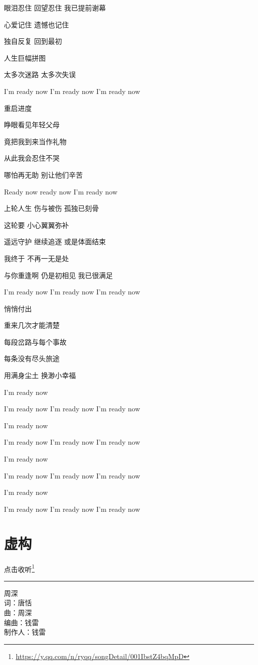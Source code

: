 \documentclass[]{ctexbook}
\renewcommand{\href}[2]{#2\footnote{\url{#1}}}
\begin{document}
眼泪忍住 回望忍住 我已提前谢幕

心爱记住 遗憾也记住

独自反复 回到最初

人生巨幅拼图

太多次迷路 太多次失误

I'm ready now I'm ready now I'm ready now

重启进度

睁眼看见年轻父母

竟把我到来当作礼物

从此我会忍住不哭

哪怕再无助 别让他们辛苦

Ready now ready now I'm ready now

上轮人生 伤与被伤 孤独已刻骨

这轮要 小心翼翼弥补

遥远守护 继续追逐 或是体面结束

我终于 不再一无是处

与你重逢啊 仍是初相见 我已很满足

I'm ready now I'm ready now I'm ready now

悄悄付出

重来几次才能清楚

每段岔路与每个事故

每条没有尽头旅途

用满身尘土 换渺小幸福

I'm ready now

I'm ready now I'm ready now I'm ready now

I'm ready now

I'm ready now I'm ready now I'm ready now

I'm ready now

I'm ready now I'm ready now I'm ready now

I'm ready now

I'm ready now I'm ready now I'm ready now

\section*{虚构}\label{the-mask}


\href{https://y.qq.com/n/ryqq/songDetail/001IbstZ4bqMpD}{点击收听}

\begin{center}\rule{0.5\linewidth}{0.5pt}\end{center}

周深\\
词：唐恬\\
曲：周深\\
编曲：钱雷\\
制作人：钱雷
\end{document}
